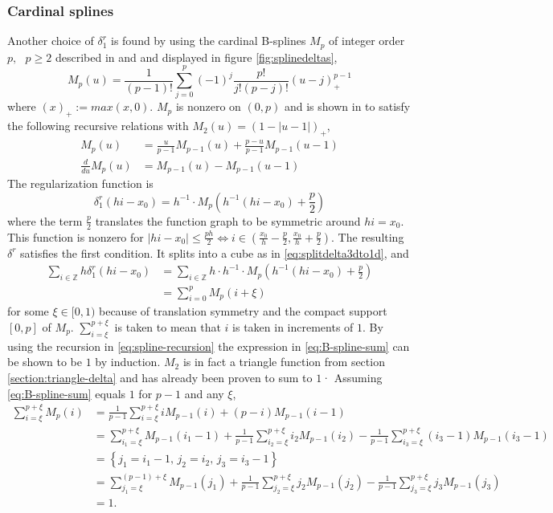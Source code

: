\documentclass[a4paper,
twoside=false,abstract=false,numbers=noenddot,
titlepage=false,headings=small,parskip=half,version=last]{scrartcl}
\begin{document}
\subsubsection{Cardinal splines}
Another choice of $\delta^r_1$ is found by using the cardinal B-splines $M_p$ of integer order $p,\text{ }p\geq2$ described in \cite{B-spline-paper} and \cite{spectralewald} and displayed in figure \ref{fig:splinedeltas},
\begin{equation}
M_p(u) = \frac{1}{(p-1)!} \sum^p_{j=0} (-1)^j \frac{p!}{j!(p-j)!}(u-j)^{p-1}_+\label{eq:cardinalspline-definition}
\end{equation}
where $(x)_+ := max(x,0)$.
$M_p$ is nonzero on $(0,p)$ and is shown in \cite{B-spline-paper} to satisfy the following recursive relations with $M_2(u) = (1-|u-1|)_+$,
\begin{align}
M_p(u) &= \frac{u}{p-1}M_{p-1}(u) + \frac{p-u}{p-1}M_{p-1}(u-1)\label{eq:spline-recursion}\\
\frac{d}{du}M_p(u) &= M_{p-1}(u) - M_{p-1}(u-1)\label{eq:spline-derivative-recursion}
\end{align}
The regularization function is
\begin{equation}
\delta^r_1(hi-x_0) = h^{-1}\cdot M_p(h^{-1}(hi-x_0)+\frac{p}{2})\nonumber
\end{equation}
where the term $\frac{p}{2}$ translates the function graph to be symmetric around $hi=x_0$.
This function is nonzero for $|hi-x_0| \leq \frac{ph}{2} \Leftrightarrow i \in (\frac{x_0}{h}-\frac{p}{2},\frac{x_0}{h}+\frac{p}{2})$.
The resulting $\delta^r$ satisfies the first condition. It splits into a cube as in \eqref{eq:splitdelta3dto1d}, and
\begin{align}
\sum_{i\in \mathbb{Z}}h\delta^{r}_1(hi-x_0) &= \sum_{i\in \mathbb{Z}} h\cdot h^{-1} \cdot M_p(h^{-1}(hi-x_0)+\frac{p}{2})\nonumber\\
		&= \sum_{i=0}^{p} M_p(i+\xi)\label{eq:B-spline-sum}
\end{align}
for some $\xi\in[0,1)$ because of translation symmetry and the compact support $[0,p]$ of $M_p$. $\sum_{i=\xi}^{p+\xi}$ is taken to mean that $i$ is taken in increments of $1$. By using the recursion in \eqref{eq:spline-recursion} the expression in \eqref{eq:B-spline-sum} can be shown to be $1$ by induction.
$M_2$ is in fact a triangle function from section \ref{section:triangle-delta} and has already been proven to sum to $1$· Assuming \eqref{eq:B-spline-sum} equals $1$ for $p-1$ and any $\xi$,
\begin{align}
\sum_{i=\xi}^{p+\xi} M_p(i) &= \frac{1}{p-1}\sum_{i=\xi}^{p+\xi} iM_{p-1}(i) + (p-i)M_{p-1}(i-1)\nonumber\\
		&= \sum_{i_1=\xi}^{p+\xi} M_{p-1}(i_1-1) + \frac{1}{p-1}\sum_{i_2=\xi}^{p+\xi} i_2M_{p-1}(i_2) - \frac{1}{p-1}\sum_{i_3=\xi}^{p+\xi} (i_3-1)M_{p-1}(i_3-1)\nonumber\\
		&= \left\{ j_1 = i_1-1\text{, } j_2 = i_2\text{, }j_3 = i_3-1\right\}\nonumber\\
		&= \sum_{j_1=\xi}^{(p-1)+\xi} M_{p-1}(j_1) + \frac{1}{p-1}\sum_{j_2=\xi}^{p+\xi} j_2M_{p-1}(j_2) - \frac{1}{p-1}\sum_{j_3=\xi}^{p+\xi} j_3M_{p-1}(j_3)\nonumber\\
		&= 1.\nonumber
\end{align}
\end{document}
